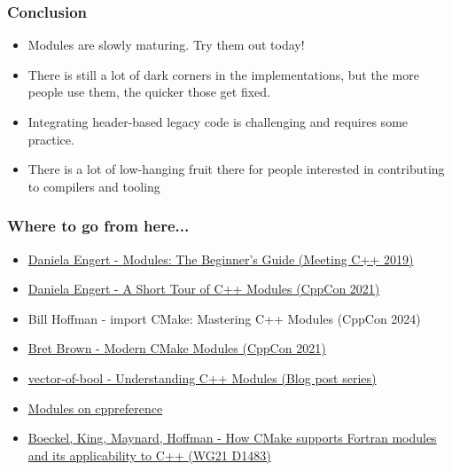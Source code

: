 \documentclass[aspectratio=169]{beamer}
\begin{document}
\begin{frame}
  \frametitle{Conclusion}

  \begin{itemize}
  \item Modules are slowly maturing. Try them out today!
  \item There is still a lot of dark corners in the implementations, but the more people use them, the quicker those get fixed.
  \item Integrating header-based legacy code is challenging and requires some
  practice.
  \item \alert<2>{There is a lot of low-hanging fruit there for people interested in contributing to compilers and tooling}
  \end{itemize}

\end{frame}

\begin{frame}
  \frametitle{Where to go from here...}

  \begin{itemize}
    \item \href{https://www.youtube.com/watch?v=Kqo-jIq4V3I}{Daniela Engert - Modules: The Beginner's Guide (Meeting C++ 2019)}
    \item \href{https://www.youtube.com/watch?v=nP8QcvPpGeM}{Daniela Engert - A Short Tour of C++ Modules (CppCon 2021)}
    \item Bill Hoffman - import CMake: Mastering C++ Modules (CppCon 2024)
    \item \href{https://www.youtube.com/watch?v=IZXNsim9TWI}{Bret Brown - Modern CMake Modules (CppCon 2021)}
    \item \href{https://vector-of-bool.github.io/2019/03/10/modules-1.html}{vector-of-bool - Understanding C++ Modules (Blog post series)}
    \item \href{https://en.cppreference.com/w/cpp/language/modules}{Modules on cppreference}
    \item \href{https://mathstuf.fedorapeople.org/fortran-modules/fortran-modules.html}{Boeckel, King, Maynard, Hoffman - How CMake supports Fortran modules and its applicability to C++ (WG21 D1483)}
  \end{itemize}
\end{frame}
\end{document}
